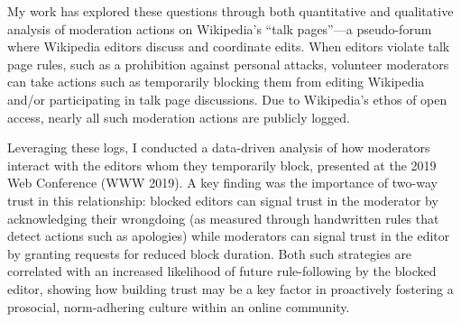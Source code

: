 \documentclass[11pt,letterpaper]{article}
\begin{document}
My work has explored these questions through both quantitative and qualitative analysis of moderation actions on Wikipedia's ``talk pages''---a pseudo-forum where Wikipedia editors discuss and coordinate edits.
When editors violate talk page rules, such as a prohibition against personal attacks, volunteer moderators can take actions such as temporarily blocking them from editing Wikipedia and/or participating in talk page discussions.
Due to Wikipedia's ethos of open access, nearly all such moderation actions are publicly logged.

Leveraging these logs, I conducted a data-driven analysis of how moderators interact with the editors whom they temporarily block, presented at the 2019 Web Conference (WWW 2019).
A key finding was the importance of two-way trust in this relationship: blocked editors can signal trust in the moderator by acknowledging their wrongdoing (as measured through handwritten rules that detect actions such as apologies) while moderators can signal trust in the editor by granting requests for reduced block duration.
Both such strategies are correlated with an increased likelihood of future rule-following by the blocked editor, showing how building trust may be a key factor in proactively fostering a prosocial, norm-adhering culture within an online community.


\end{document}
